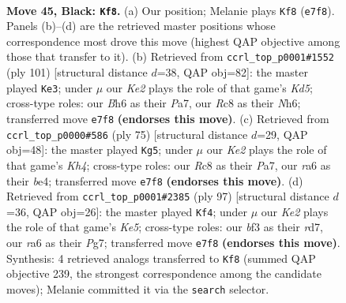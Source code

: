\documentclass[11pt]{article}
\begin{document}
\clearpage

\begin{figure}[p]\centering
\begin{subfigure}{0.46\textwidth}\centering
\resizebox{\linewidth}{!}{%
\newchessgame
\chessboard[
  setfen={2r5/1R2kP2/R6b/8/1P3r1p/5B2/5K2/8 b - - 1 45},
  showmover=false,
  pgfstyle=straightmove, color=movearrow, markmove={e7-f8}
]}
\caption{}
\end{subfigure}\hfill
\begin{subfigure}{0.46\textwidth}\centering
\resizebox{\linewidth}{!}{%
\newchessgame
\chessboard[
  setfen={4R3/p7/5rpn/7P/3kP3/1r3BK1/8/3R4 b - - 11 51},
  showmover=false,
  pgfstyle=straightmove, color=movearrow, markmove={d4-e3}
]}
\caption{}
\end{subfigure}
\\[4pt]
\begin{subfigure}{0.46\textwidth}\centering
\resizebox{\linewidth}{!}{%
\newchessgame
\chessboard[
  setfen={8/p6R/5p2/7k/4B3/4b1P1/P4r1P/6K1 b - - 8 38},
  showmover=false,
  pgfstyle=straightmove, color=movearrow, markmove={h5-g5}
]}
\caption{}
\end{subfigure}\hfill
\begin{subfigure}{0.46\textwidth}\centering
\resizebox{\linewidth}{!}{%
\newchessgame
\chessboard[
  setfen={8/3R2p1/6p1/3Bb3/4k1P1/1Pr4P/8/5K2 b - - 13 49},
  showmover=false,
  pgfstyle=straightmove, color=movearrow, markmove={e4-f4}
]}
\caption{}
\end{subfigure}
\caption{\textbf{Move 45, Black: \texttt{Kf8}.} (a) Our position; Melanie plays \texttt{Kf8} (\texttt{e7f8}). Panels (b)--(d) are the retrieved master positions whose correspondence most drove this move (highest QAP objective among those that transfer to it). (b) Retrieved from \texttt{ccrl\_top\_p0001\#1552} (ply 101) [structural distance $d$=38, QAP obj=82]: the master played \texttt{Ke3}; under $\mu$ our \emph{Ke2} plays the role of that game's \emph{Kd5}; cross-type roles: our \emph{B}h6 as their \emph{P}a7, our \emph{R}c8 as their \emph{N}h6; transferred move \texttt{e7f8} \textbf{(endorses this move)}. (c) Retrieved from \texttt{ccrl\_top\_p0000\#586} (ply 75) [structural distance $d$=29, QAP obj=48]: the master played \texttt{Kg5}; under $\mu$ our \emph{Ke2} plays the role of that game's \emph{Kh4}; cross-type roles: our \emph{R}c8 as their \emph{P}a7, our \emph{r}a6 as their \emph{b}e4; transferred move \texttt{e7f8} \textbf{(endorses this move)}. (d) Retrieved from \texttt{ccrl\_top\_p0001\#2385} (ply 97) [structural distance $d$=36, QAP obj=26]: the master played \texttt{Kf4}; under $\mu$ our \emph{Ke2} plays the role of that game's \emph{Ke5}; cross-type roles: our \emph{b}f3 as their \emph{r}d7, our \emph{r}a6 as their \emph{P}g7; transferred move \texttt{e7f8} \textbf{(endorses this move)}. Synthesis: 4 retrieved analogs transferred to \texttt{Kf8} (summed QAP objective 239, the strongest correspondence among the candidate moves); Melanie committed it via the \texttt{search} selector.}
\label{fig:thought-m89}
\end{figure}
\end{document}
